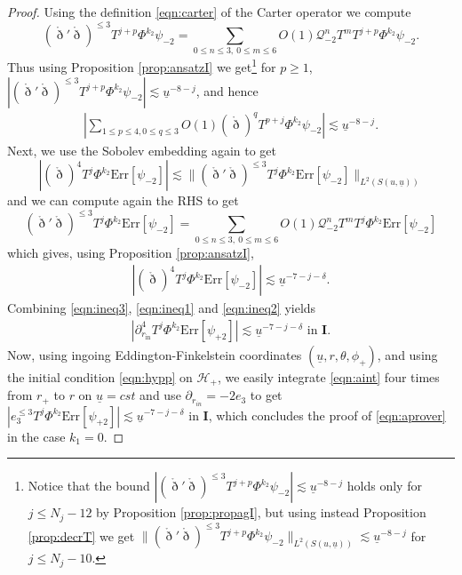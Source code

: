 \documentclass[reqno]{amsart}
\numberwithin{equation}{section}
\newcommand{\mch}{\mathcal{H}}
\newcommand{\mcq}{\mathcal{Q}}
\newcommand{\ubar}{{\underline{u}}}
\newcommand{\errp}{\mathrm{Err}[\Psip]}
\newcommand{\errm}{\mathrm{Err}[\Psim]}
\newcommand{\drond}{\mathring{\eth}}
\newcommand{\un}{\mathbf{I}}
\newcommand{\Psip}{\psi_{+2}}
\newcommand{\Psim}{\psi_{-2}}
\newcommand{\psim}{\psi_{-2}}
\newcommand{\drin}{\partial_{r_{in}}}
\theoremstyle{plain}
\theoremstyle{definition}
\theoremstyle{remark}
\numberwithin{equation}{section}
\begin{document}
\begin{proof}
Using the definition \eqref{eqn:carter} of the Carter operator we compute 
$$(\drond'\drond)^{\leq 3}T^{j+p}\Phi^{k_2}\psim=\sum_{0\leq n\leq 3,\: 0\leq m\leq 6 }O(1)\mcq_{-2}^nT^mT^{j+p}\Phi^{k_2}\psim.$$
Thus using Proposition \ref{prop:ansatzI} we get\footnote{Notice that the bound $|(\drond'\drond)^{\leq 3}T^{j+p}\Phi^{k_2}\psim|\lesssim \ubar^{-8-j}$ holds only for $j\leq N_j-12$ by Proposition \ref{prop:propagI}, but using instead Proposition \ref{prop:decrT} we get $\|(\drond'\drond)^{\leq 3}T^{j+p}\Phi^{k_2}\psim\|_{L^2(S(u,\ubar))}\lesssim \ubar^{-8-j}$ for $j\leq N_j-10$.} for $p\geq 1$, $|(\drond'\drond)^{\leq 3}T^{j+p}\Phi^{k_2}\psim|\lesssim \ubar^{-8-j}$, and hence 
\begin{align}\label{eqn:ineq1}
    \left|\sum_{1\leq p\leq 4,0\leq q\leq 3}O(1)(\drond)^{q}T^{p+j}\Phi^{k_2}\psim\right|\lesssim\ubar^{-8-j}.
\end{align}
Next, we use the Sobolev embedding again to get $$|(\drond)^4T^j\Phi^{k_2}\errm|\lesssim \|(\drond'\drond)^{\leq3}T^j\Phi^{k_2}\errm\|_{L^2(S(u,\ubar))} $$ and we can compute again the RHS to get 
$$(\drond'\drond)^{\leq3}T^j\Phi^{k_2}\errm=\sum_{0\leq n\leq 3,\:0\leq m\leq 6}O(1)\mcq_{-2}^nT^mT^j\Phi^{k_2}\errm $$
which gives, using Proposition \ref{prop:ansatzI}, 
\begin{align}\label{eqn:ineq2}
    |(\drond)^4T^j\Phi^{k_2}\errm|\lesssim\ubar^{-7-j-\delta}.
\end{align}
Combining \eqref{eqn:ineq3}, \eqref{eqn:ineq1} and \eqref{eqn:ineq2} yields 
\begin{align}\label{eqn:aint}
    |\partial_{r_\mathrm{in}}^4T^j\Phi^{k_2}\errp|\lesssim\ubar^{-7-j-\delta}\text{   in    }\un.
\end{align}
Now, using ingoing Eddington-Finkelstein coordinates $(\ubar,r,\theta,\phi_{+})$, and using the initial condition \eqref{eqn:hypp} on $\mch_+$, we easily integrate \eqref{eqn:aint} four times from $r_+$ to $r$ on $\ubar=cst$ and use $\drin=-2e_3$ to get $|e_3^{\leq 3}T^j\Phi^{k_2}\errp|\lesssim\ubar^{-7-j-\delta}$ in $\un$, which concludes the proof of \eqref{eqn:aprover} in the case $k_1=0$.


\end{proof}
\end{document}
